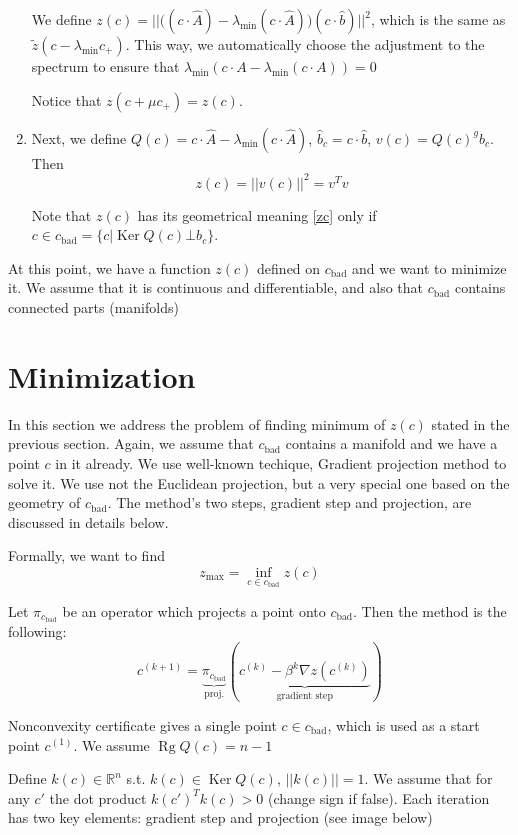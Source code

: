 \documentclass[a4paper]{article}
\DeclareMathOperator{\Rg}{Rg}
\DeclareMathOperator{\Ker}{Ker}
\newcommand{\cbad}{c_{\mathrm{bad}}}
\begin{document}
\begin{enumerate}
We define $z(c)=||\big((c\cdot \hat{A})-\lambda_{\min}(c\cdot \hat{A})\big)(c\cdot \hat{b})||^2$, which is the same as $\tilde{z}(c-\lambda_{\min}c_+)$. This way, we automatically choose the adjustment to the spectrum to ensure that $\lambda_{\min}(c\cdot A-\lambda_{\min}(c\cdot A))=0$

Notice that $z(c+\mu c_+)=z(c)$.

\item Next, we define $Q(c)=c\cdot \hat{A}-\lambda_{\min}(c\cdot \hat{A})$, $\hat{b}_c=c\cdot \hat{b}$, $v(c)=Q(c)^gb_c$. Then $$z(c)=||v(c)||^2=v^Tv$$

Note that $z(c)$ has its geometrical meaning \ref{zc} only if $c\in\cbad=\{c\big|\Ker Q(c)\bot b_c\}$.
\end{enumerate}

At this point, we have a function $z(c)$ defined on $\cbad$ and we want to minimize it. We assume that it is continuous and differentiable, and also that $\cbad$ contains connected parts (manifolds)

\section{Minimization}
In this section we address the problem of finding minimum of $z(c)$ stated in the previous section. Again, we assume that $\cbad$ contains a manifold and we have a point $c$ in it already. We use well-known techique, Gradient projection method to solve it. We use not the Euclidean projection, but a very special one based on the geometry of $\cbad$. The method's two steps, gradient step and projection, are discussed in details below.

Formally, we want to find
\begin{equation}
z_{\max}=\inf\limits_{c\in\cbad}z(c)
\end{equation}

Let $\pi_{\cbad}$ be an operator which projects a point onto $\cbad$. Then the method is the following:
$$c^{(k+1)}=\underbrace{\pi_{\cbad}}_{\mathrm{proj.}}(\underbrace{c^{(k)}-\beta^k \nabla z(c^{(k)})}_{\mathrm{gradient \,\,step}})$$


Nonconvexity certificate gives a single point $c\in \cbad$, which is used as a start point $c^{(1)}$. We assume $\Rg Q(c)=n-1$

Define $k(c)\in\mathbb{R}^n$ s.t. $k(c)\in\Ker Q(c)$, $||k(c)||=1$. We assume that for any $c'$ the dot product $k(c')^Tk(c)>0$ (change sign if false).
Each iteration has two key elements: gradient step and projection (see image below)
\end{document}
